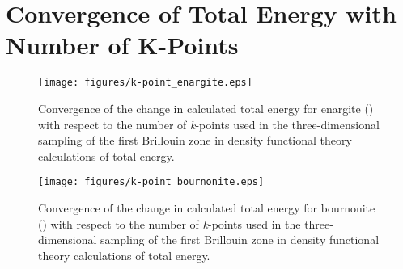 
\clearpage

\section*{Convergence of Total Energy with Number of K-Points}\label{k-points}

\begin{figure}[h!]
  \centering
    \texttt{[image: figures/k-point\_enargite.eps]}
    \caption{Convergence of the change in calculated total energy for enargite ({\enargite}) with respect to the number of \textit{k}-points used in the three-dimensional sampling of the first Brillouin zone in density functional theory calculations of total energy.}
  \label{k-point_enargite}
\end{figure}

\begin{figure}[h!]
  \centering
    \texttt{[image: figures/k-point\_bournonite.eps]}
    \caption{Convergence of the change in calculated total energy for bournonite ({\bournonite}) with respect to the number of \textit{k}-points used in the three-dimensional sampling of the first Brillouin zone in density functional theory calculations of total energy.}
  \label{k-point_bournonite}
\end{figure}


